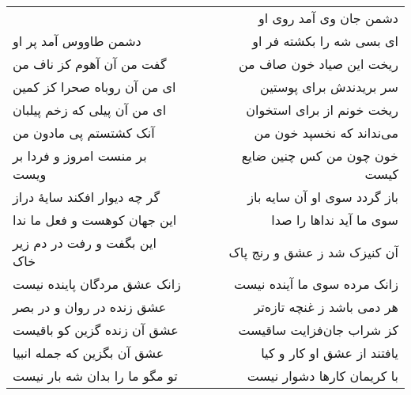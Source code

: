 \begin{center}
\begin{longtable}{l p{0.5cm} r}
&&
دشمن جان وی آمد روی او
\\
دشمن طاووس آمد پر او
&&
ای بسی شه را بکشته فر او
\\
گفت من آن آهوم کز ناف من
&&
ریخت این صیاد خون صاف من
\\
ای من آن روباه صحرا کز کمین
&&
سر بریدندش برای پوستین
\\
ای من آن پیلی که زخم پیلبان
&&
ریخت خونم از برای استخوان
\\
آنک کشتستم پی مادون من
&&
می‌نداند که نخسپد خون من
\\
بر منست امروز و فردا بر ویست
&&
خون چون من کس چنین ضایع کیست
\\
گر چه دیوار افکند سایهٔ دراز
&&
باز گردد سوی او آن سایه باز
\\
این جهان کوهست و فعل ما ندا
&&
سوی ما آید نداها را صدا
\\
این بگفت و رفت در دم زیر خاک
&&
آن کنیزک شد ز عشق و رنج پاک
\\
زانک عشق مردگان پاینده نیست
&&
زانک مرده سوی ما آینده نیست
\\
عشق زنده در روان و در بصر
&&
هر دمی باشد ز غنچه تازه‌تر
\\
عشق آن زنده گزین کو باقیست
&&
کز شراب جان‌فزایت ساقیست
\\
عشق آن بگزین که جمله انبیا
&&
یافتند از عشق او کار و کیا
\\
تو مگو ما را بدان شه بار نیست
&&
با کریمان کارها دشوار نیست
\\
\end{longtable}
\end{center}
